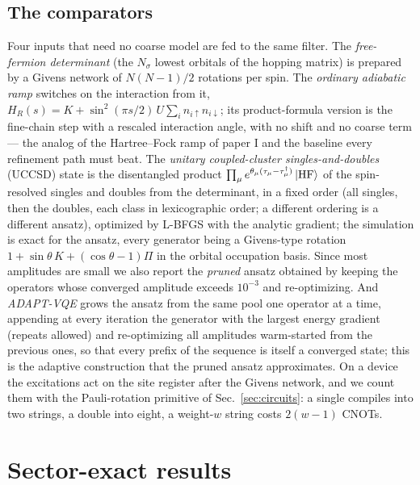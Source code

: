 \documentclass[a4paper,11pt,noarxiv]{quantumarticle}
\begin{document}
\subsection{The comparators}
\label{sec:uccsd}
Four inputs that need no coarse model are fed to the same filter.  The
\emph{free-fermion determinant} (the $N_\sigma$ lowest orbitals of the
hopping matrix) is prepared by a Givens network of $N(N-1)/2$ rotations per
spin.  The \emph{ordinary adiabatic ramp} switches on the interaction from
it, $H_R(s)=K+\sin^2(\pi s/2)\,U\sum_in_{i\uparrow}n_{i\downarrow}$; its
product-formula version is the fine-chain step with a rescaled interaction
angle, with no shift and no coarse term --- the analog of the Hartree--Fock
ramp of paper I and the baseline every refinement path must beat.  The
\emph{unitary coupled-cluster singles-and-doubles} (UCCSD) state is the
disentangled product $\prod_\mu e^{\theta_\mu(\tau_\mu-\tau_\mu^\dagger)}\ket{\rm HF}$
of the spin-resolved singles and doubles from the determinant, in a fixed
order (all singles, then the doubles, each class in lexicographic order; a
different ordering is a different ansatz), optimized by L-BFGS with the
analytic gradient; the simulation is exact for the ansatz, every generator
being a Givens-type rotation $1+\sin\theta\,K+(\cos\theta-1)\Pi$ in the
orbital occupation basis.  Since most amplitudes are small we also report
the \emph{pruned} ansatz obtained by keeping the operators whose converged
amplitude exceeds $10^{-3}$ and re-optimizing.  And \emph{ADAPT-VQE}
grows the ansatz from the same pool one operator at a time, appending at
every iteration the generator with the largest energy gradient (repeats
allowed) and re-optimizing all amplitudes warm-started from the previous
ones, so that every prefix of the sequence is itself a converged state;
this is the adaptive construction that the pruned ansatz approximates.  On a
device the excitations act on the site register after the Givens network,
and we count them with the Pauli-rotation primitive of
Sec.~\ref{sec:circuits}: a single compiles into two strings, a double into
eight, a weight-$w$ string costs $2(w-1)$ CNOTs.

\section{Sector-exact results}
\label{sec:results}
\end{document}
